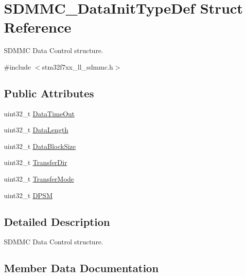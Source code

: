 \hypertarget{struct_s_d_m_m_c___data_init_type_def}{}\section{S\+D\+M\+M\+C\+\_\+\+Data\+Init\+Type\+Def Struct Reference}
\label{struct_s_d_m_m_c___data_init_type_def}


S\+D\+M\+MC Data Control structure.  




{\ttfamily \#include $<$stm32f7xx\+\_\+ll\+\_\+sdmmc.\+h$>$}

\subsection*{Public Attributes}
\begin{DoxyCompactItemize}
\item 
uint32\+\_\+t \mbox{\hyperlink{struct_s_d_m_m_c___data_init_type_def_a33e216962a7e7eb09d4bbccc3d570a80}{Data\+Time\+Out}}
\item 
uint32\+\_\+t \mbox{\hyperlink{struct_s_d_m_m_c___data_init_type_def_a99928f6dd559ef244c4b8642b4ab0fee}{Data\+Length}}
\item 
uint32\+\_\+t \mbox{\hyperlink{struct_s_d_m_m_c___data_init_type_def_a677d2c11f8e856c4a889f856d27ba50f}{Data\+Block\+Size}}
\item 
uint32\+\_\+t \mbox{\hyperlink{struct_s_d_m_m_c___data_init_type_def_a2063df8379a9d397d78178063bab6ec0}{Transfer\+Dir}}
\item 
uint32\+\_\+t \mbox{\hyperlink{struct_s_d_m_m_c___data_init_type_def_a8e8508ca753fbdf33e72f0c01b5d4136}{Transfer\+Mode}}
\item 
uint32\+\_\+t \mbox{\hyperlink{struct_s_d_m_m_c___data_init_type_def_a18c3531154bb359cacd475852da8cd12}{D\+P\+SM}}
\end{DoxyCompactItemize}


\subsection{Detailed Description}
S\+D\+M\+MC Data Control structure. 

\subsection{Member Data Documentation}
\mbox{\label{struct_s_d_m_m_c___data_init_type_def_a677d2c11f8e856c4a889f856d27ba50f}} 
